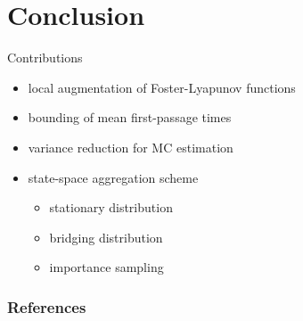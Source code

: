 \documentclass[10pt]{beamer}
\begin{document}
\section{Conclusion}
\begin{frame}{Contributions}
    \begin{itemize}
        \item local augmentation of Foster-Lyapunov functions
        \item bounding of mean first-passage times \parencite{backenkohler2019bounding}
        \item variance reduction for MC estimation \parencite{backenkohler2019control,backenkohler2021variance}
        \item state-space aggregation scheme
            \begin{itemize}
                \item stationary distribution \parencite{backenkohler2021abstraction}
                \item bridging distribution \parencite{backenkohler2020analysis}
                \item importance sampling
            \end{itemize}
    \end{itemize}
\end{frame}

\begin{frame}[allowframebreaks]
    \frametitle{References}
%        
    \printbibliography
\end{frame}

\end{document}
